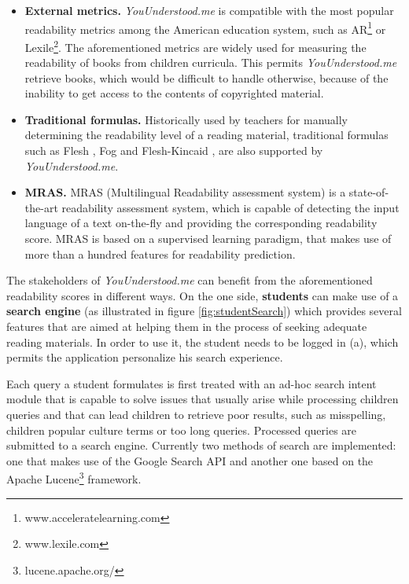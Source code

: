 \documentclass{sig-alternate-05-2015}
\begin{document}
\begin{itemize}
\item \textbf{External metrics.} \textit{YouUnderstood.me} is compatible with the most popular readability metrics among the American education system, such as AR\footnote{www.acceleratelearning.com} or Lexile\footnote{www.lexile.com}. The aforementioned metrics are widely used for measuring the readability of books from children curricula. This permits \textit{YouUnderstood.me} retrieve books, which would be difficult to handle otherwise, because of the inability to get access to the contents of copyrighted material.
\item \textbf{Traditional formulas.} Historically used by teachers for manually determining the readability level of a reading material, traditional formulas such as Flesh \cite{flesch1948new}, Fog\cite{gunning1952technique} and Flesh-Kincaid \cite{flesch1948new}, are also supported by \textit{YouUnderstood.me}. 
\item \textbf{MRAS.} MRAS (Multilingual Readability assessment system)\cite{imadrazo2016readability} is a state-of-the-art readability assessment system, which is capable of detecting the input language of a text on-the-fly and providing the corresponding readability score. MRAS is based on a supervised learning paradigm, that makes use of more than a hundred features for readability prediction. 



\end{itemize}

The stakeholders of \textit{YouUnderstood.me} can benefit from the aforementioned readability scores in different ways. On the one side, \textbf{students} can make use of a \textbf{search engine} (as illustrated in figure \ref{fig:studentSearch}) which provides several features that are aimed at helping them in the process of seeking adequate reading materials. In order to use it, the student needs to be logged in (a), which permits the application personalize his search experience.

Each query a student formulates is first treated with an ad-hoc search intent module that is capable to solve issues that usually arise while processing children queries and that can lead children to retrieve poor results, such as misspelling, children popular culture terms or too long queries. Processed queries are submitted to a search engine.  Currently two methods of search are implemented: one that makes use of the Google Search API and another one based on the Apache Lucene\footnote{lucene.apache.org/} framework.
\end{document}
